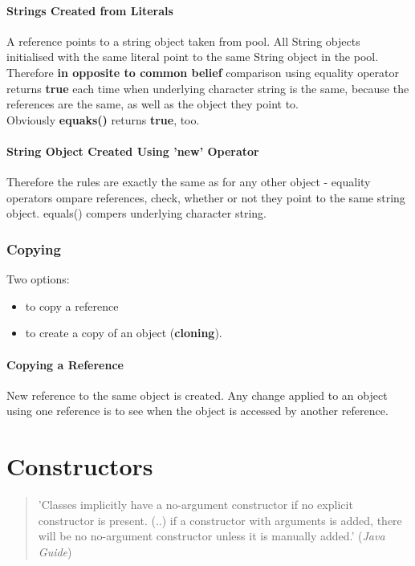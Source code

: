 \documentclass{report}
\begin{document}
\subsubsection{Strings Created from Literals}
A reference points to a string object taken from pool. All String objects initialised with the same literal point to the same String object in the pool.
Therefore \textbf{in opposite to common belief} comparison using equality operator returns \textbf{true} each time when underlying character string is the same, because the references 
are the same, as well as the object they point to. \\
Obviously \textbf{equaks()} returns \textbf{true}, too.

\subsubsection{String Object Created Using 'new' Operator}
Therefore the rules are exactly the same as for any other object - equality operators ompare references, check, whether or not they point to the same string object. equals() compers underlying character string.

\subsection{Copying}
Two options:
\begin{itemize}
	\item to copy a reference
	\item to create a copy of an object (\textbf{cloning}).
\end{itemize}

\subsubsection{Copying a Reference}
New reference to the same object is created. Any change applied to an object using one reference is to see when the object is accessed by another reference.



\chapter{Constructors}
\begin{quotation}
	'Classes implicitly have a no-argument constructor if no explicit constructor is present. (..) if a constructor with arguments is added, there will be no no-argument constructor unless it is manually added.' (\textit{Java Guide})
\end{quotation}
\end{document}
